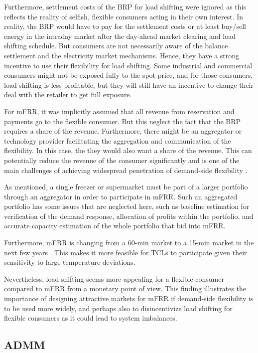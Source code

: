 Furthermore, settlement costs of the BRP for load shifting were ignored as this reflects the reality of selfish, flexible consumers acting in their own interest. In reality, the BRP would have to pay for the settlement costs or at least buy/sell energy in the intraday market after the day-ahead market clearing and load shifting schedule. But consumers are not necessarily aware of the balance settlement and the electricity market mechanisms. Hence, they have a strong incentive to use their flexibility for load shifting. Some industrial and commercial consumers might not be exposed fully to the spot price, and for those consumers, load shifting is less profitable, but they will still have an incentive to change their deal with the retailer to get full exposure.

For mFRR, it was implicitly assumed that all revenue from reservation and payments go to the flexible consumer. But this neglect the fact that the BRP requires a share of the revenue. Furthermore, there might be an aggregator or technology provider facilitating the aggregation and communication of the flexibility. In this case, the they would also want a share of the revenue. This can potentially reduce the revenue of the consumer significantly and is one of the main challenges of achieving widespread penetration of demand-side flexibility \cite{gade2022ecosystem}.

As mentioned, a single freezer or supermarket must be part of a larger portfolio through an aggregator in order to participate in mFRR. Such an aggregated portfolio has some issues that are neglected here, such as baseline estimation for verification of the demand response, allocation of profits within the portfolio, and accurate capacity estimation of the whole portfolio that bid into mFRR.

Furthermore, mFRR is changing from a 60-min market to a 15-min market in the next few years \cite{MARI}. This makes it more feasible for TCLs to participate given their sensitivity to large temperature deviations.

Nevertheless, load shifting seems more appealing for a flexible consumer compared to mFRR from a monetary point of view. This finding illustrates the importance of designing attractive markets for mFRR if demand-side flexibility is to be used more widely, and perhaps also to disincentivize load shifting for flexible consumers as it could lead to system imbalances.


\subsection{ADMM}

